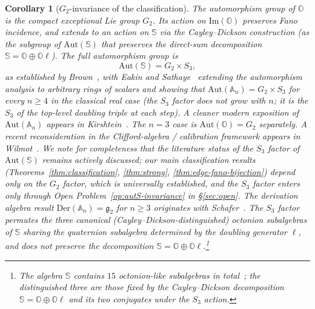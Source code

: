 \documentclass[12pt,a4paper]{article}
\newtheorem{corollary}[theorem]{Corollary}
\begin{document}
\begin{corollary}[$G_2$-invariance of the classification]
\label{cor:g2-invariance}
The automorphism group of $\mathbb{O}$ is the compact exceptional Lie group $G_2$. Its action on $\mathrm{Im}(\mathbb{O})$ preserves Fano incidence, and extends to an action on $\mathbb{S}$ via the Cayley--Dickson construction (as the subgroup of $\mathrm{Aut}(\mathbb{S})$ that preserves the direct-sum decomposition $\mathbb{S} = \mathbb{O} \oplus \mathbb{O}\ell$). The full automorphism group is
\[
  \mathrm{Aut}(\mathbb{S}) = G_2 \times S_3,
\]
as established by Brown~\cite{brown1967}, with Eakin and Sathaye~\cite{eakin_sathaye1990} extending the automorphism analysis to arbitrary rings of scalars and showing that $\mathrm{Aut}(\mathbb{A}_n) = G_2 \times S_3$ for every $n \geq 4$ in the classical real case (the $S_3$ factor does not grow with $n$; it is the $S_3$ of the top-level doubling triple at each step). A cleaner modern exposition of $\mathrm{Aut}(\mathbb{A}_n)$ appears in Kirshtein~\cite{kirshtein2012}. The $n = 3$ case is $\mathrm{Aut}(\mathbb{O}) = G_2$ separately. A recent reconsideration in the Clifford-algebra / calibration framework appears in Wilmot~\cite{wilmot2025auto}.
We note for completeness that the literature status of the $S_3$ factor of $\mathrm{Aut}(\mathbb{S})$ remains actively discussed; our main classification results (Theorems~\ref{thm:classification}, \ref{thm:strong}, \ref{thm:edge-fano-bijection}) depend only on the $G_2$ factor, which is universally established, and the $S_3$ factor enters only through Open Problem~\ref{op:autS-invariance} in \S\ref{sec:open}.
The derivation algebra result $\mathrm{Der}(\mathbb{A}_n) = \mathfrak{g}_2$ for $n \geq 3$ originates with Schafer~\cite{schafer1954}. The $S_3$ factor permutes the three canonical (Cayley--Dickson-distinguished) octonion subalgebras of $\mathbb{S}$ sharing the quaternion subalgebra determined by the doubling generator $\ell$, and does \emph{not} preserve the decomposition $\mathbb{S} = \mathbb{O} \oplus \mathbb{O}\ell$.\footnote{The algebra $\mathbb{S}$ contains $15$ octonion-like subalgebras in total~\cite{wilmot2025auto}; the distinguished three are those fixed by the Cayley--Dickson decomposition $\mathbb{S} = \mathbb{O} \oplus \mathbb{O}\ell$ and its two conjugates under the $S_3$ action.}

\end{corollary}
\end{document}
